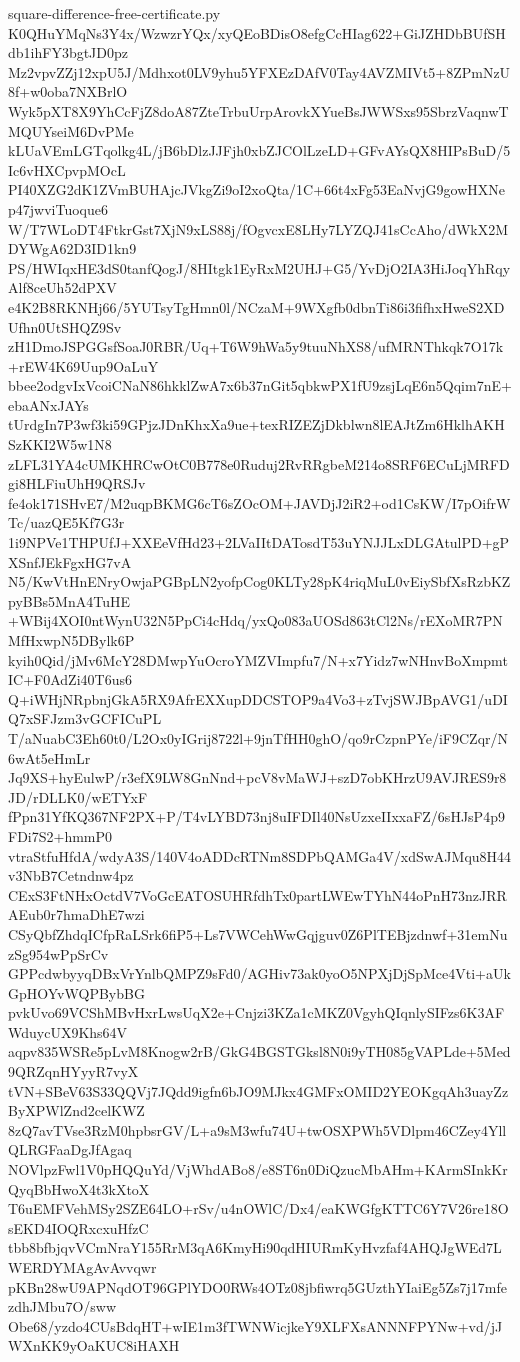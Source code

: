 \documentclass[11pt]{article}
\theoremstyle{definition}
\theoremstyle{remark}
\begin{document}
\begin{filecontents*}[overwrite]{square-difference-free-certificate.py}
K0QHuYMqNs3Y4x/WzwzrYQx/xyQEoBDisO8efgCcHIag622+GiJZHDbBUfSHdb1ihFY3bgtJD0pz
Mz2vpvZZj12xpU5J/Mdhxot0LV9yhu5YFXEzDAfV0Tay4AVZMIVt5+8ZPmNzU8f+w0oba7NXBrlO
Wyk5pXT8X9YhCcFjZ8doA87ZteTrbuUrpArovkXYueBsJWWSxs95SbrzVaqnwTMQUYseiM6DvPMe
kLUaVEmLGTqolkg4L/jB6bDlzJJFjh0xbZJCOlLzeLD+GFvAYsQX8HIPsBuD/5Ic6vHXCpvpMOcL
PI40XZG2dK1ZVmBUHAjcJVkgZi9oI2xoQta/1C+66t4xFg53EaNvjG9gowHXNep47jwviTuoque6
W/T7WLoDT4FtkrGst7XjN9xLS88j/fOgvcxE8LHy7LYZQJ41sCcAho/dWkX2MDYWgA62D3ID1kn9
PS/HWIqxHE3dS0tanfQogJ/8HItgk1EyRxM2UHJ+G5/YvDjO2IA3HiJoqYhRqyAlf8ceUh52dPXV
e4K2B8RKNHj66/5YUTsyTgHmn0l/NCzaM+9WXgfb0dbnTi86i3fifhxHweS2XDUfhn0UtSHQZ9Sv
zH1DmoJSPGGsfSoaJ0RBR/Uq+T6W9hWa5y9tuuNhXS8/ufMRNThkqk7O17k+rEW4K69Uup9OaLuY
bbee2odgvIxVcoiCNaN86hkklZwA7x6b37nGit5qbkwPX1fU9zsjLqE6n5Qqim7nE+ebaANxJAYs
tUrdgIn7P3wf3ki59GPjzJDnKhxXa9ue+texRIZEZjDkblwn8lEAJtZm6HklhAKHSzKKI2W5w1N8
zLFL31YA4cUMKHRCwOtC0B778e0Ruduj2RvRRgbeM214o8SRF6ECuLjMRFDgi8HLFiuUhH9QRSJv
fe4ok171SHvE7/M2uqpBKMG6cT6sZOcOM+JAVDjJ2iR2+od1CsKW/I7pOifrWTc/uazQE5Kf7G3r
1i9NPVe1THPUfJ+XXEeVfHd23+2LVaIItDATosdT53uYNJJLxDLGAtulPD+gPXSnfJEkFgxHG7vA
N5/KwVtHnENryOwjaPGBpLN2yofpCog0KLTy28pK4riqMuL0vEiySbfXsRzbKZpyBBs5MnA4TuHE
+WBij4XOI0ntWynU32N5PpCi4cHdq/yxQo083aUOSd863tCl2Ns/rEXoMR7PNMfHxwpN5DBylk6P
kyih0Qid/jMv6McY28DMwpYuOcroYMZVImpfu7/N+x7Yidz7wNHnvBoXmpmtIC+F0AdZi40T6us6
Q+iWHjNRpbnjGkA5RX9AfrEXXupDDCSTOP9a4Vo3+zTvjSWJBpAVG1/uDIQ7xSFJzm3vGCFICuPL
T/aNuabC3Eh60t0/L2Ox0yIGrij8722l+9jnTfHH0ghO/qo9rCzpnPYe/iF9CZqr/N6wAt5eHmLr
Jq9XS+hyEulwP/r3efX9LW8GnNnd+pcV8vMaWJ+szD7obKHrzU9AVJRES9r8JD/rDLLK0/wETYxF
fPpn31YfKQ367NF2PX+P/T4vLYBD73nj8uIFDIl40NsUzxeIIxxaFZ/6sHJsP4p9FDi7S2+hmmP0
vtraStfuHfdA/wdyA3S/140V4oADDcRTNm8SDPbQAMGa4V/xdSwAJMqu8H44v3NbB7Cetndnw4pz
CExS3FtNHxOctdV7VoGcEATOSUHRfdhTx0partLWEwTYhN44oPnH73nzJRRAEub0r7hmaDhE7wzi
CSyQbfZhdqICfpRaLSrk6fiP5+Ls7VWCehWwGqjguv0Z6PlTEBjzdnwf+31emNuzSg954wPpSrCv
GPPcdwbyyqDBxVrYnlbQMPZ9sFd0/AGHiv73ak0yoO5NPXjDjSpMce4Vti+aUkGpHOYvWQPBybBG
pvkUvo69VCShMBvHxrLwsUqX2e+Cnjzi3KZa1cMKZ0VgyhQIqnlySIFzs6K3AFWduycUX9Khs64V
aqpv835WSRe5pLvM8Knogw2rB/GkG4BGSTGksl8N0i9yTH085gVAPLde+5Med9QRZqnHYyyR7vyX
tVN+SBeV63S33QQVj7JQdd9igfn6bJO9MJkx4GMFxOMID2YEOKgqAh3uayZzByXPWlZnd2celKWZ
8zQ7avTVse3RzM0hpbsrGV/L+a9sM3wfu74U+twOSXPWh5VDlpm46CZey4YllQLRGFaaDgJfAgaq
NOVlpzFwl1V0pHQQuYd/VjWhdABo8/e8ST6n0DiQzucMbAHm+KArmSInkKrQyqBbHwoX4t3kXtoX
T6uEMFVehMSy2SZE64LO+rSv/u4nOWlC/Dx4/eaKWGfgKTTC6Y7V26re18OsEKD4IOQRxcxuHfzC
tbb8bfbjqvVCmNraY155RrM3qA6KmyHi90qdHIURmKyHvzfaf4AHQJgWEd7LWERDYMAgAvAvvqwr
pKBn28wU9APNqdOT96GPlYDO0RWs4OTz08jbfiwrq5GUzthYIaiEg5Zs7j17mfezdhJMbu7O/sww
Obe68/yzdo4CUsBdqHT+wIE1m3fTWNWicjkeY9XLFXsANNNFPYNw+vd/jJWXnKK9yOaKUC8iHAXH

\end{filecontents*}
\end{document}

